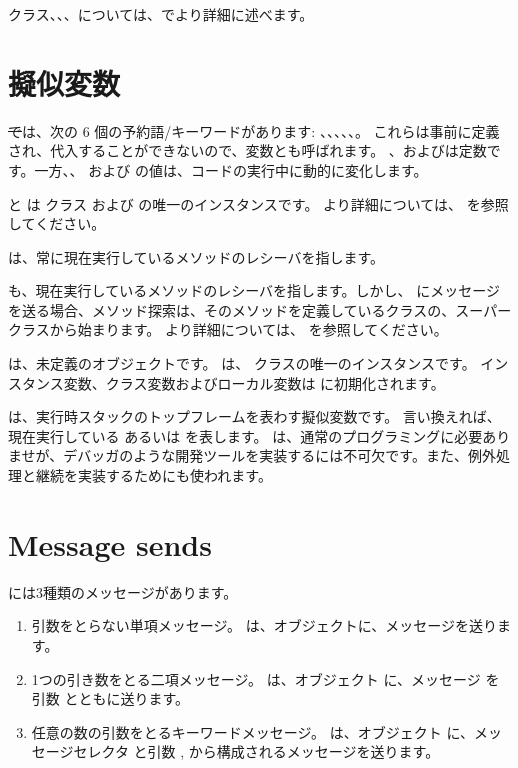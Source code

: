 \documentclass[a4paper,10pt,twoside]{book}
\begin{document}
クラス、、、については、でより詳細に述べます。


\section{擬似変数}

\st では、次の 6 個の予約語/キーワードがあります:
、、、、、。
これらは事前に定義され、代入することができないので、変数とも呼ばれます。
、およびは定数です。一方、、 および  の値は、コードの実行中に動的に変化します。

 と  は  クラス  および  の唯一のインスタンスです。
より詳細については、 を参照してください。

 は、常に現在実行しているメソッドのレシーバを指します。

 も、現在実行しているメソッドのレシーバを指します。しかし、 にメッセージを送る場合、メソッド探索は、そのメソッドを定義しているクラスの、スーパークラスから始まります。
より詳細については、 を参照してください。

 は、未定義のオブジェクトです。
 は、 クラスの唯一のインスタンスです。
インスタンス変数、クラス変数およびローカル変数は  に初期化されます。

 は、実行時スタックのトップフレームを表わす擬似変数です。
言い換えれば、現在実行している  あるいは  を表します。
 は、通常のプログラミングに必要ありませが、デバッガのような開発ツールを実装するには不可欠です。また、例外処理と継続を実装するためにも使われます。

\section{Message sends}

\pharo には3種類のメッセージがあります。
\begin{enumerate}
  \item 引数をとらない単項メッセージ。
  は、オブジェクトに、メッセージを送ります。
  \item 1つの引き数をとる二項メッセージ。
  	は、オブジェクト  に、メッセージ \ct{+} を引数  とともに送ります。
  \item 任意の数の引数をとるキーワードメッセージ。
  	 は、オブジェクト  に、メッセージセレクタ
	 と引数 ,  から構成されるメッセージを送ります。
\end{enumerate}
\end{document}
